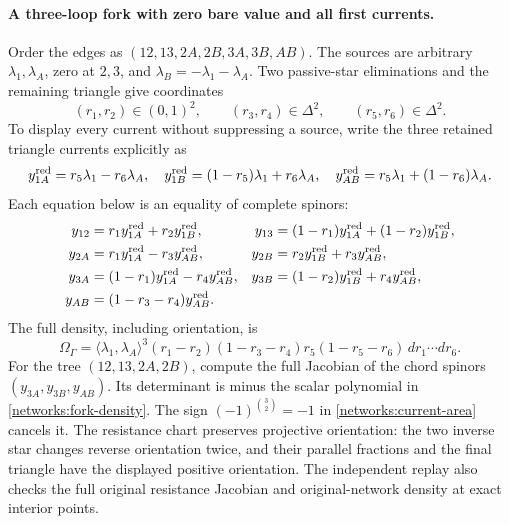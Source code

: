 \paragraph{A three-loop fork with zero bare value and all first currents.}
Order the edges as $(12,13,2A,2B,3A,3B,AB)$.  The sources are arbitrary
$\lambda_1,\lambda_A$, zero at $2,3$, and
$\lambda_B=-\lambda_1-\lambda_A$.  Two passive-star eliminations and the
remaining triangle give coordinates
\begin{equation}
 (r_1,r_2)\in(0,1)^2,\qquad
 (r_3,r_4)\in\Delta^2,\qquad(r_5,r_6)\in\Delta^2.
 \label{networks:fork-domain}
\end{equation}
To display every current without suppressing a source, write the three
retained triangle currents explicitly as
\begin{equation}
 y_{1A}^{\rm red}=r_5\lambda_1-r_6\lambda_A,\quad
 y_{1B}^{\rm red}=(1-r_5)\lambda_1+r_6\lambda_A,\quad
 y_{AB}^{\rm red}=r_5\lambda_1+(1-r_6)\lambda_A.
 \label{networks:fork-reduced}
\end{equation}
Each equation below is an equality of complete spinors:
\begin{align}
 y_{12}&=r_1y_{1A}^{\rm red}+r_2y_{1B}^{\rm red},&
 y_{13}&=(1-r_1)y_{1A}^{\rm red}+(1-r_2)y_{1B}^{\rm red},\\
 y_{2A}&=r_1y_{1A}^{\rm red}-r_3y_{AB}^{\rm red},&
 y_{2B}&=r_2y_{1B}^{\rm red}+r_3y_{AB}^{\rm red},\\
 y_{3A}&=(1-r_1)y_{1A}^{\rm red}-r_4y_{AB}^{\rm red},&
 y_{3B}&=(1-r_2)y_{1B}^{\rm red}+r_4y_{AB}^{\rm red},\\
 y_{AB}&=(1-r_3-r_4)y_{AB}^{\rm red}.&&
 \label{networks:fork-all-currents}
\end{align}
The full density, including orientation, is
\begin{equation}
 \Omega_\Gamma=\langle\lambda_1,\lambda_A\rangle^3
 (r_1-r_2)(1-r_3-r_4)r_5(1-r_5-r_6)
                       \,dr_1\cdots dr_6.
 \label{networks:fork-density}
\end{equation}
For the tree $(12,13,2A,2B)$, compute the full Jacobian of the chord
spinors $(y_{3A},y_{3B},y_{AB})$.  Its determinant is minus the scalar
polynomial in \eqref{networks:fork-density}.  The sign
$(-1)^{\binom32}=-1$ in \eqref{networks:current-area} cancels it.
The resistance chart preserves projective orientation: the two inverse
star changes reverse orientation twice, and their parallel fractions and
the final triangle have the displayed positive orientation.  The
independent replay also checks the full original resistance Jacobian and
original-network density at exact interior points.

